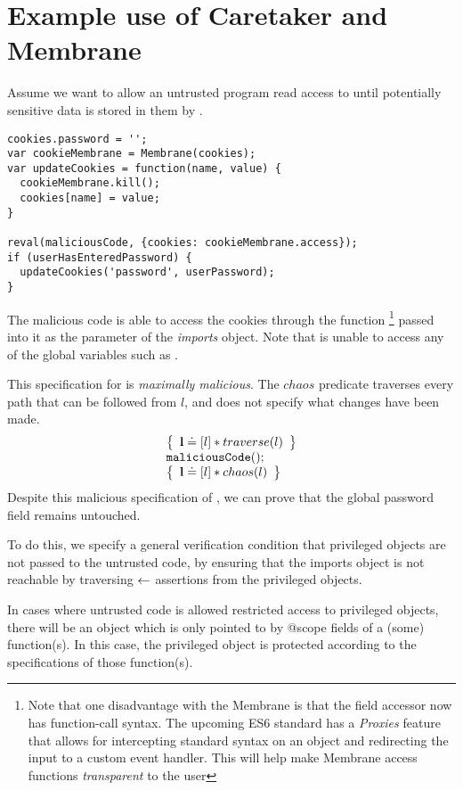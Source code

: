\documentclass[a4paper,notitlepage]{report}
\begin{document}
\section{Example use of Caretaker and Membrane}
Assume we want to allow an untrusted program read access to  until
potentially sensitive data is stored in them by .

\begin{verbatim}
cookies.password = '';
var cookieMembrane = Membrane(cookies);
var updateCookies = function(name, value) {
  cookieMembrane.kill();
  cookies[name] = value;
}

reval(maliciousCode, {cookies: cookieMembrane.access});
if (userHasEnteredPassword) {
  updateCookies('password', userPassword);
}
\end{verbatim}

The malicious code is able to access the cookies through the
 function%
\footnote{
  Note that one disadvantage with the Membrane is that the field accessor now has
  function-call syntax. The upcoming ES6 standard has a \emph{Proxies} feature
  that allows for intercepting standard syntax on an object and redirecting the
  input to a custom event handler. This will help make Membrane access functions
  \emph{transparent} to the user
}
passed into it as the  parameter of the \emph{imports} object.
Note that  is unable to access any of the global variables
such as .

This specification for  is \emph{maximally malicious}. The
$chaos$ predicate traverses every path that can be followed from $l$, and does
not specify what changes have been made.
\[
  \begin{array}{l}
    \left\{ \begin{array}{l} \textbf{l} \doteq [l] \mathbin{*} traverse(l) \end{array} \right\} \\
    \mathtt{maliciousCode();} \\
    \left\{ \begin{array}{l} \textbf{l} \doteq [l] \mathbin{*} chaos(l) \end{array} \right\}
  \end{array}
\]
Despite this malicious specification of , we can prove that the
global password field remains untouched.

To do this, we specify a general verification condition that privileged
objects are not passed to the untrusted code, by ensuring that the imports
object is not reachable by traversing $\leftarrow$ assertions from the privileged
objects.

In cases where untrusted code is allowed restricted access to privileged
objects, there will be an object which is only pointed to by @scope fields
of a (some) function(s). In this case, the privileged object is protected
according to the specifications of those function(s).
\end{document}
